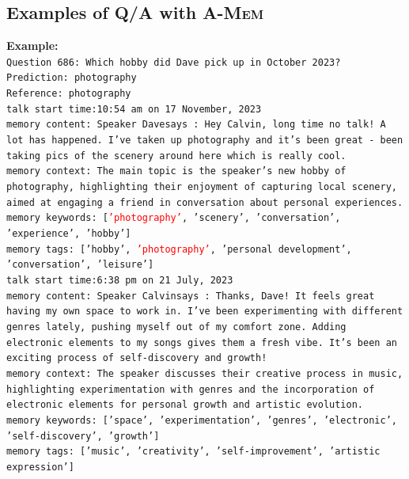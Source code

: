 \documentclass{article}
\newcommand{\ours}{\textsc{A-Mem}\xspace}
\begin{document}
\subsection{Examples of Q/A with \ours}
\begin{tcolorbox}[colback=white!95!gray, colframe=black, width=1\textwidth, arc=4mm, boxrule=0.5mm]
\noindent \textbf{Example:} \\  
\texttt{Question 686: Which hobby did Dave pick up in October 2023? \\
Prediction: photography \\
Reference: photography \\
talk start time:10:54 am on 17 November, 2023 \\
memory content: Speaker Davesays : Hey Calvin, long time no talk! A lot has happened. I've taken up photography and it's been great - been taking pics of the scenery around here which is really cool. \\
memory context: The main topic is the speaker's new hobby of photography, highlighting their enjoyment of capturing local scenery, aimed at engaging a friend in conversation about personal experiences.\\
memory keywords: [\textcolor{red}{'photography'}, 'scenery', 'conversation', 'experience', 'hobby'] \\
memory tags: ['hobby', \textcolor{red}{'photography'}, 'personal development', 'conversation', 'leisure'] \\
talk start time:6:38 pm on 21 July, 2023 \\
memory content: Speaker Calvinsays : Thanks, Dave! It feels great having my own space to work in. I've been experimenting with different genres lately, pushing myself out of my comfort zone. Adding electronic elements to my songs gives them a fresh vibe. It's been an exciting process of self-discovery and growth! \\
memory context: The speaker discusses their creative process in music, highlighting experimentation with genres and the incorporation of electronic elements for personal growth and artistic evolution.\\
memory keywords: ['space', 'experimentation', 'genres', 'electronic', 'self-discovery', 'growth']\\
memory tags: ['music', 'creativity', 'self-improvement', 'artistic expression'] \\ } 
\end{tcolorbox}


\end{document}
